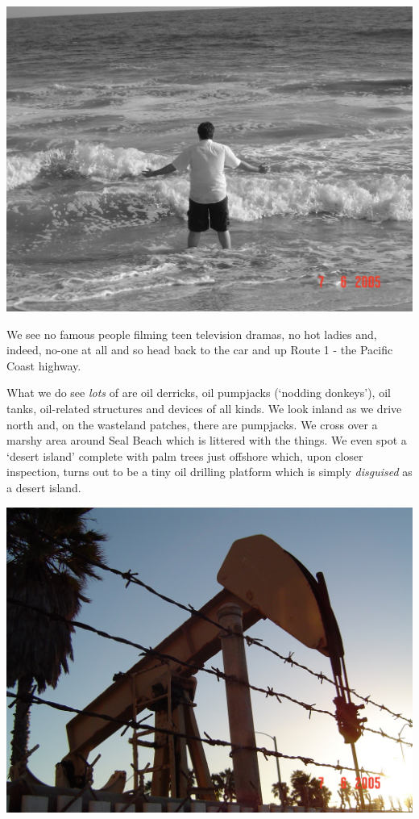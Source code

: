 \documentclass[a5paper,titlepage,11pt]{book}
\begin{document}
\begin{center}\includegraphics[width=\textwidth]{gfx/pacific}\end{center}

We see no famous people filming teen television dramas, no hot ladies and, indeed, no-one at all and so head back to the car and up Route 1 - the Pacific Coast highway.

What we do see \emph{lots} of are oil derricks, oil pumpjacks (`nodding donkeys'), oil tanks, oil-related structures and devices of all kinds.  We look inland as we drive north and, on the wasteland patches, there are pumpjacks.  We cross over a marshy area around Seal Beach which is littered with the things.  We even spot a `desert island' complete with palm trees just offshore which, upon closer inspection, turns out to be a tiny oil drilling platform which is simply \emph{disguised} as a desert island.

\begin{center}\includegraphics[width=\textwidth]{gfx/pumpjack}\end{center}
\end{document}
